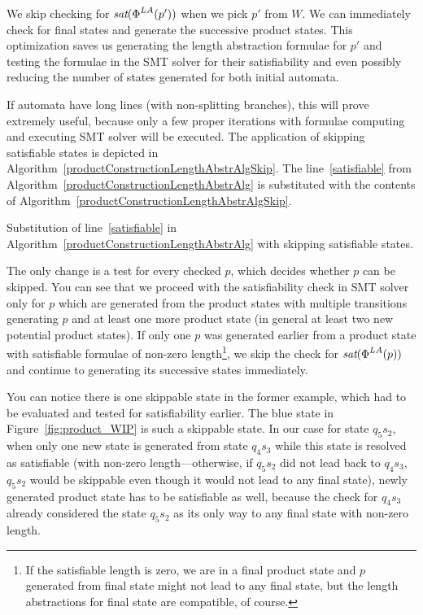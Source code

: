 We skip checking for $\emph{sat}(\emph{$\Phi$}^{LA}(p'))$ when we pick $p'$ from $W$. We can immediately check for final states and generate the successive product states. This optimization saves us generating the length abstraction formulae for $p'$ and testing the formulae in the SMT solver for their satisfiability and even possibly reducing the number of states generated for both initial automata.

If automata have long lines (with non-splitting branches), this will prove extremely useful, because only a few proper iterations with formulae computing and executing SMT solver will be executed. The application of skipping satisfiable states is depicted in Algorithm~\ref{productConstructionLengthAbstrAlgSkip}. The line~\ref{satisfiable} from Algorithm~\ref{productConstructionLengthAbstrAlg} is substituted with the contents of Algorithm~\ref{productConstructionLengthAbstrAlgSkip}.

\begin{algorithm}[ht]
    \caption{Substitution of line~\ref{satisfiable} in Algorithm~\ref{productConstructionLengthAbstrAlg} with skipping satisfiable states.} \label{productConstructionLengthAbstrAlgSkip}
    \DontPrintSemicolon
\end{algorithm}

The only change is a test for every checked $p$, which decides whether $p$ can be skipped. You can see that we proceed with the satisfiability check in SMT solver  only for $p$ which are generated from the product states with multiple transitions generating $p$ and at least one more product state (in general at least two new potential product states). If only one $p$ was generated earlier from a product state with satisfiable formulae of non-zero length\footnote{If the satisfiable length is zero, we are in a final product state and $p$ generated from final state might not lead to any final state, but the length abstractions for final state are compatible, of course.}, we skip the check for $\emph{sat}(\emph{$\Phi$}^{LA}(p))$ and continue to generating its successive states immediately.

You can notice there is one skippable state in the former example, which had to be evaluated and tested for satisfiability earlier. The blue state in Figure~\ref{fig:product_WIP} is such a skippable state. In our case for state $q_5s_2$, when only one new state is generated from state $q_4s_3$ while this state is resolved as satisfiable (with non-zero length---otherwise, if $q_5s_2$ did not lead back to $q_4s_3$, $q_5s_2$ would be skippable even though it would not lead to any final state), newly generated product state has to be satisfiable as well, because the check for $q_4s_3$ already considered the state $q_5s_2$ as its only way to any final state with non-zero length.

